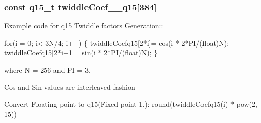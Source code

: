 \subsubsection[{\texorpdfstring{twiddle\+Coef\+\_\+256\+\_\+q15}{twiddleCoef_256_q15}}]{\setlength{\rightskip}{0pt plus 5cm}const q15\+\_\+t twiddle\+Coef\+\_\+\_\+q15\mbox{[}384\mbox{]}}\hypertarget{group__CFFT__CIFFT_ga6099ae5262a0a3a8d9ce1e6da02f0c2e}{}\label{group__CFFT__CIFFT_ga6099ae5262a0a3a8d9ce1e6da02f0c2e}
\begin{DoxyParagraph}{}
Example code for q15 Twiddle factors Generation\+:\+: 
\end{DoxyParagraph}
\begin{DoxyParagraph}{}

\begin{DoxyPre}for(i = 0; i< 3N/4; i++)
\{
   twiddleCoefq15[2*i]= cos(i * 2*PI/(float)N);
   twiddleCoefq15[2*i+1]= sin(i * 2*PI/(float)N);
\} \end{DoxyPre}
 
\end{DoxyParagraph}
\begin{DoxyParagraph}{}
where N = 256 and PI = 3. 
\end{DoxyParagraph}
\begin{DoxyParagraph}{}
Cos and Sin values are interleaved fashion 
\end{DoxyParagraph}
\begin{DoxyParagraph}{}
Convert Floating point to q15(Fixed point 1.)\+: round(twiddle\+Coefq15(i) $\ast$ pow(2, 15)) 
\end{DoxyParagraph}
